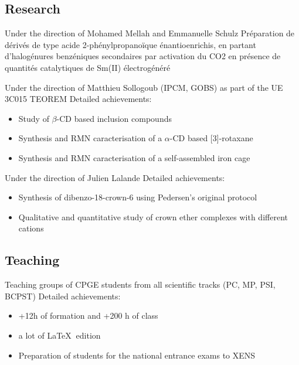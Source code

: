 \documentclass[11pt,a4paper,sans]{moderncv}
\begin{document}
\subsection{Research}

%
{Under the direction of Mohamed Mellah and Emmanuelle Schulz\newline{}%
Préparation de dérivés de type acide 2-phénylpropanoïque énantioenrichis, en partant d'halogénures benzéniques secondaires par activation du CO2 en présence de quantités catalytiques de Sm(II) électrogénéré
}


%
{Under the direction of Matthieu Sollogoub (IPCM, GOBS) as part of the UE 3C015 TEOREM\newline{}%
Detailed achievements:%
\begin{itemize}%
\item Study of $\beta$-CD based inclusion compounds
\item Synthesis and RMN caracterisation of a $\alpha$-CD based [3]-rotaxane
\item Synthesis and RMN caracterisation of a self-assembled iron cage
\end{itemize}
}

%
{Under the direction of Julien Lalande \newline{}%
Detailed achievements:%
\begin{itemize}%
\item Synthesis of dibenzo-18-crown-6 using Pedersen's original protocol
\item Qualitative and quantitative study of crown ether complexes with different cations
\end{itemize}
}


\subsection{Teaching}
%
{Teaching groups of CPGE students from all scientific tracks (PC, MP, PSI, BCPST)\newline{}%
Detailed achievements:%
\begin{itemize}%
\item +12h of formation and +200 h of class
\item a lot of {\LaTeX} $~$edition
\item Preparation of students for the national entrance exams to XENS
\end{itemize}
}
\end{document}
